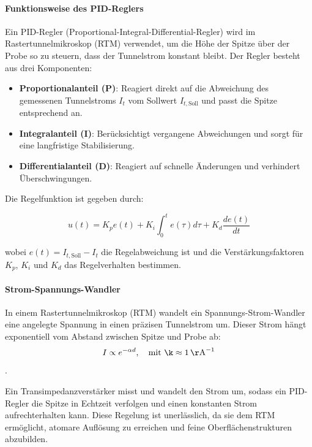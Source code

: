 \paragraph{Funktionsweise des PID-Reglers}

Ein PID-Regler (Proportional-Integral-Differential-Regler) wird im Rastertunnelmikroskop (RTM) verwendet, um die Höhe der Spitze über der Probe so zu steuern, dass der Tunnelstrom konstant bleibt. Der Regler besteht aus drei Komponenten:


\begin{itemize}
    \item \textbf{Proportionalanteil (P)}: Reagiert direkt auf die Abweichung des gemessenen Tunnelstroms $I_t$ vom Sollwert $I_{t, \text{Soll}}$ und passt die Spitze entsprechend an.
    \item \textbf{Integralanteil (I)}: Berücksichtigt vergangene Abweichungen und sorgt für eine langfristige Stabilisierung.
    \item \textbf{Differentialanteil (D)}: Reagiert auf schnelle Änderungen und verhindert Überschwingungen.
\end{itemize}

Die Regelfunktion ist gegeben durch:

\begin{equation}
    u(t) = K_p e(t) + K_i \int_0^t e(\tau) d\tau + K_d \frac{d e(t)}{dt}
\end{equation}

wobei $e(t) = I_{t, \text{Soll}} - I_t$ die Regelabweichung ist und die Verstärkungsfaktoren $K_p$, $K_i$ und $K_d$ das Regelverhalten bestimmen.

\paragraph{Strom-Spannungs-Wandler}
In einem Rastertunnelmikroskop (RTM) wandelt ein Spannungs-Strom-Wandler eine angelegte Spannung in einen präzisen Tunnelstrom um. Dieser Strom hängt exponentiell vom Abstand zwischen Spitze und Probe ab:
\begin{equation}
    I \propto e^{-\alpha d}, \quad \text{mit } \k \approx 1\, \mathrm{\AA}^{-1} %
\end{equation}
\cite{Tunnelstrom}.

Ein Transimpedanzverstärker misst und wandelt den Strom um, sodass ein PID-Regler die Spitze in Echtzeit verfolgen und einen konstanten Strom aufrechterhalten kann. Diese Regelung ist unerlässlich, da sie dem RTM ermöglicht, atomare Auflösung zu erreichen und feine Oberflächenstrukturen abzubilden.

